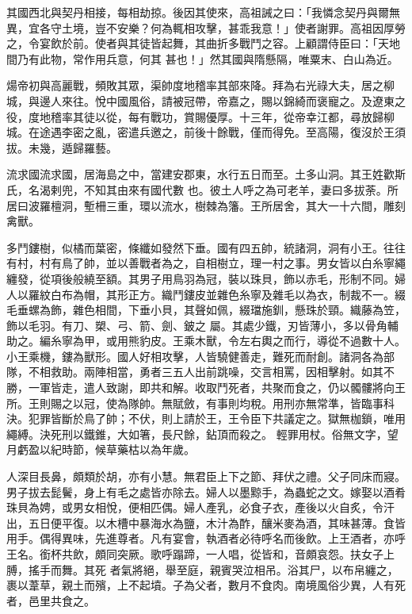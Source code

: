 \begin{pinyinscope}
 其國西北與契丹相接，每相劫掠。後因其使來，高祖誡之曰：「我憐念契丹與爾無異，宜各守土境，豈不安樂？何為輒相攻擊，甚乖我意！」使者謝罪。高祖因厚勞之，令宴飲於前。使者與其徒皆起舞，其曲折多戰鬥之容。上顧謂侍臣曰：「天地間乃有此物，常作用兵意，何其
 甚也！」然其國與隋懸隔，唯粟末、白山為近。



 煬帝初與高麗戰，頻敗其眾，渠帥度地稽率其部來降。拜為右光祿大夫，居之柳城，與邊人來往。悅中國風俗，請被冠帶，帝嘉之，賜以錦綺而褒寵之。及遼東之役，度地稽率其徒以從，每有戰功，賞賜優厚。十三年，從帝幸江都，尋放歸柳城。在途遇李密之亂，密遣兵邀之，前後十餘戰，僅而得免。至高陽，復沒於王須拔。未幾，遁歸羅藝。



 流求國流求國，居海島之中，當建安郡東，水行五日而至。土多山洞。其王姓歡斯氏，名渴剌兜，不知其由來有國代數
 也。彼土人呼之為可老羊，妻曰多拔荼。所居曰波羅檀洞，塹柵三重，環以流水，樹棘為籓。王所居舍，其大一十六間，雕刻禽獸。



 多鬥鏤樹，似橘而葉密，條纖如發然下垂。國有四五帥，統諸洞，洞有小王。往往有村，村有鳥了帥，並以善戰者為之，自相樹立，理一村之事。男女皆以白糸寧繩纏發，從項後般繞至額。其男子用鳥羽為冠，裝以珠貝，飾以赤毛，形制不同。婦人以羅紋白布為帽，其形正方。織鬥鏤皮並雜色糸寧及雜毛以為衣，制裁不一。綴毛垂螺為飾，雜色相間，下垂小貝，其聲如佩，綴璫施釧，懸珠於頸。織藤為笠，飾以毛羽。有刀、槊、弓、箭、劍、鈹之
 屬。其處少鐵，刃皆薄小，多以骨角輔助之。編糸寧為甲，或用熊豹皮。王乘木獸，令左右輿之而行，導從不過數十人。小王乘機，鏤為獸形。國人好相攻擊，人皆驍健善走，難死而耐創。諸洞各為部隊，不相救助。兩陣相當，勇者三五人出前跳噪，交言相罵，因相擊射。如其不勝，一軍皆走，遣人致謝，即共和解。收取鬥死者，共聚而食之，仍以髑髏將向王所。王則賜之以冠，使為隊帥。無賦斂，有事則均稅。用刑亦無常準，皆臨事科決。犯罪皆斷於鳥了帥；不伏，則上請於王，王令臣下共議定之。獄無枷鎖，唯用繩縛。決死刑以鐵錐，大如箸，長尺餘，鉆頂而殺之。
 輕罪用杖。俗無文字，望月虧盈以紀時節，候草藥枯以為年歲。



 人深目長鼻，頗類於胡，亦有小慧。無君臣上下之節、拜伏之禮。父子同床而寢。男子拔去髭鬢，身上有毛之處皆亦除去。婦人以墨黥手，為蟲蛇之文。嫁娶以酒肴珠貝為娉，或男女相悅，便相匹偶。婦人產乳，必食子衣，產後以火自炙，令汗出，五日便平復。以木槽中暴海水為鹽，木汁為酢，釀米麥為酒，其味甚薄。食皆用手。偶得異味，先進尊者。凡有宴會，執酒者必待呼名而後飲。上王酒者，亦呼王名。銜杯共飲，頗同突厥。歌呼蹋蹄，一人唱，從皆和，音頗哀怨。扶女子上膊，搖手而舞。其死
 者氣將絕，舉至庭，親賓哭泣相吊。浴其尸，以布帛纏之，裹以葦草，親土而殯，上不起墳。子為父者，數月不食肉。南境風俗少異，人有死者，邑里共食之。




\end{pinyinscope}
